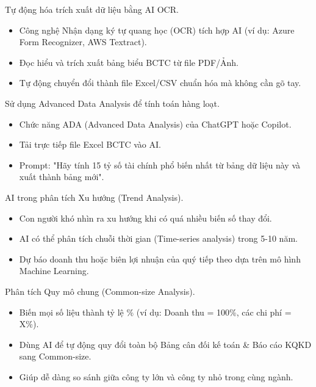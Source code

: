 \documentclass[aspectratio=169]{beamer}
\begin{document}
\begin{frame}{Tự động hóa trích xuất dữ liệu bằng AI OCR.}
    \begin{itemize}
        \item Công nghệ Nhận dạng ký tự quang học (OCR) tích hợp AI (ví dụ: Azure Form Recognizer, AWS Textract).
        \item Đọc hiểu và trích xuất bảng biểu BCTC từ file PDF/Ảnh.
        \item Tự động chuyển đổi thành file Excel/CSV chuẩn hóa mà không cần gõ tay.
    \end{itemize}
\end{frame}


\begin{frame}{Sử dụng Advanced Data Analysis để tính toán hàng loạt.}
    \begin{itemize}
        \item Chức năng ADA (Advanced Data Analysis) của ChatGPT hoặc Copilot.
        \item Tải trực tiếp file Excel BCTC vào AI.
        \item Prompt: "Hãy tính 15 tỷ số tài chính phổ biến nhất từ bảng dữ liệu này và xuất thành bảng mới".
    \end{itemize}
\end{frame}


\begin{frame}{AI trong phân tích Xu hướng (Trend Analysis).}
    \begin{itemize}
        \item Con người khó nhìn ra xu hướng khi có quá nhiều biến số thay đổi.
        \item AI có thể phân tích chuỗi thời gian (Time-series analysis) trong 5-10 năm.
        \item Dự báo doanh thu hoặc biên lợi nhuận của quý tiếp theo dựa trên mô hình Machine Learning.
    \end{itemize}
\end{frame}


\begin{frame}{Phân tích Quy mô chung (Common-size Analysis).}
    \begin{itemize}
        \item Biến mọi số liệu thành tỷ lệ \% (ví dụ: Doanh thu = 100\%, các chi phí = X\%).
        \item Dùng AI để tự động quy đổi toàn bộ Bảng cân đối kế toán \& Báo cáo KQKD sang Common-size.
        \item Giúp dễ dàng so sánh giữa công ty lớn và công ty nhỏ trong cùng ngành.
    \end{itemize}
\end{frame}
\end{document}
